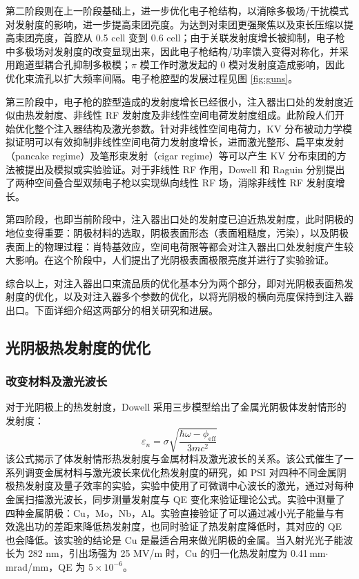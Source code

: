 第二阶段则在上一阶段基础上，进一步优化电子枪结构，以消除多极场/干扰模式对发射度的影响，进一步提高束团亮度。为达到对束团更强聚焦以及束长压缩以提高束团亮度，首腔从 0.5 cell 变到 0.6 cell\cite{Lehrman:1992aa}；由于关联发射度增长被抑制，电子枪中多极场对发射度的改变显现出来，因此电子枪结构/功率馈入变得对称化\cite{Palmer:1998aa}，并采用跑道型耦合孔抑制多极模\cite{Limborg:2005vn, Akre:2008aa}；$\pi$ 模工作时激发起的 0 模对发射度造成影响，因此优化束流孔以扩大频率间隔\cite{Palmer:1998aa}。电子枪腔型的发展过程见图 \ref{fig:guns}。

第三阶段中，电子枪的腔型造成的发射度增长已经很小，注入器出口处的发射度近似由热发射度、非线性 RF 发射度及非线性空间电荷发射度组成\cite{Qiu:1996aa}。此阶段人们开始优化整个注入器结构及激光参数。针对非线性空间电荷力，KV 分布\cite{Kapchinskij:1959aa}被动力学模拟证明可以有效抑制非线性空间电荷力发射度增长\cite{Limborg-Deprey:2006aa,Khojoyan:2013aa}，进而激光整形、扁平束发射（pancake regime）及笔形束发射（cigar regime）等可以产生 KV 分布束团的方法被提出及模拟或实验验证\cite{Khojoyan:2013aa,Khojoyan:2014aa,Musumeci:2008ab,Li:2012aa}。对于非线性 RF 作用，Dowell 和 Raguin 分别提出了两种空间叠合型双频电子枪\cite{Dowell:2004aa,Raguin:2005aa}以实现纵向线性 RF 场，消除非线性 RF 发射度增长。

第四阶段，也即当前阶段中，注入器出口处的发射度已迫近热发射度，此时阴极的地位变得重要：阴极材料的选取，阴极表面形态（表面粗糙度，污染）\cite{Vecchione:2012aa,Vecchione:2013aa}，以及阴极表面上的物理过程：肖特基效应，空间电荷限等都会对注入器出口处发射度产生较大影响\cite{qian2012experimental}。在这个阶段中，人们提出了光阴极表面极限亮度并进行了实验验证\cite{bazarov2009maximum}。

综合以上，对注入器出口束流品质的优化基本分为两个部分，即对光阴极表面热发射度的优化，以及对注入器多个参数的优化，以将光阴极的横向亮度保持到注入器出口。下面详细介绍这两部分的相关研究和进展。

\subsection{光阴极热发射度的优化}
\subsubsection{改变材料及激光波长}
对于光阴极上的热发射度，Dowell 采用三步模型给出了金属光阴极体发射情形的发射度\cite{Dowell:2006aa,dowell2009quantum}：
\[
	\varepsilon_{n} =\sigma\sqrt{\dfrac{\hbar\omega-\phi_{\mathrm{eff}}}{3mc^2}}
\]
该公式揭示了体发射情形热发射度与金属材料及激光波长的关系。该公式催生了一系列调变金属材料与激光波长来优化热发射度的研究，如 PSI 对四种不同金属阴极热发射度及量子效率的实验\cite{hauri2010intrinsic}，实验中使用了可微调中心波长的激光，通过对每种金属扫描激光波长，同步测量发射度与 QE 变化来验证理论公式。实验中测量了四种金属阴极：Cu，Mo，Nb，Al。实验直接验证了可以通过减小光子能量与有效逸出功的差距来降低热发射度，也同时验证了热发射度降低时，其对应的 QE 也会降低。该实验的结论是 Cu 是最适合用来做光阴极的金属。当入射光光子能波长为 282 nm，引出场强为 25 MV/m  时，Cu 的归一化热发射度为 0.41\,mm$\cdot$mrad/mm，QE 为 $5\times10^{-6}$。

